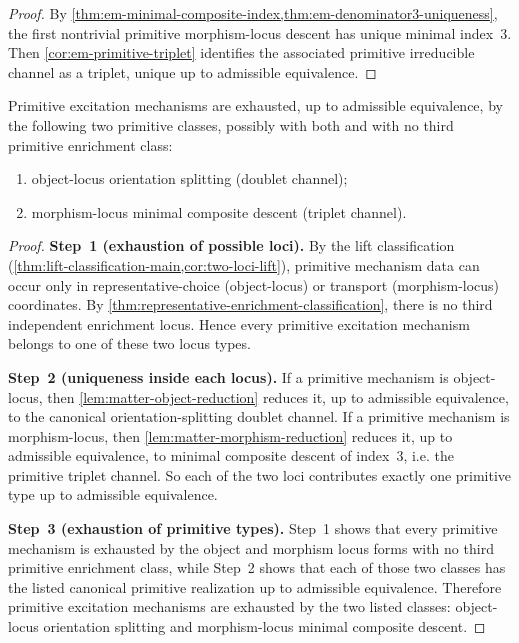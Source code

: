 \begin{proof}
By
\cref{thm:em-minimal-composite-index,thm:em-denominator3-uniqueness},
the first nontrivial primitive morphism-locus descent has unique minimal
index~$3$.
Then \cref{cor:em-primitive-triplet} identifies the associated primitive
irreducible channel as a triplet, unique up to admissible equivalence.
\end{proof}

\begin{theorem}
\label{thm:matter-primitive-uniqueness}
Primitive excitation mechanisms are exhausted, up to admissible
equivalence, by the following two primitive classes, possibly with
both and with no third primitive enrichment class:
\begin{enumerate}[label=\textup{(\roman*)}]
\item object-locus orientation splitting (doublet channel);
\item morphism-locus minimal composite descent (triplet channel).
\end{enumerate}
\end{theorem}

\begin{proof}
\textbf{Step~1 (exhaustion of possible loci).}
By the lift classification
(\cref{thm:lift-classification-main,cor:two-loci-lift}), primitive
mechanism data can occur only in representative-choice (object-locus)
or transport (morphism-locus) coordinates.
By
\cref{thm:representative-enrichment-classification}, there is no third
independent enrichment locus.
Hence every primitive excitation mechanism belongs to one of these two
locus types.

\textbf{Step~2 (uniqueness inside each locus).}
If a primitive mechanism is object-locus, then
\cref{lem:matter-object-reduction} reduces it, up to admissible
equivalence, to the canonical orientation-splitting doublet channel.
If a primitive mechanism is morphism-locus, then
\cref{lem:matter-morphism-reduction} reduces it, up to admissible
equivalence, to minimal composite descent of index~$3$, i.e. the
primitive triplet channel.
So each of the two loci contributes exactly one primitive type up to
admissible equivalence.

\textbf{Step~3 (exhaustion of primitive types).}
Step~1 shows that every primitive mechanism is exhausted by the object
and morphism locus forms with no third primitive enrichment class,
while Step~2 shows that each of those two classes has the listed
canonical primitive realization up to admissible equivalence.
Therefore primitive excitation mechanisms are exhausted by the two
listed classes: object-locus orientation splitting and morphism-locus
minimal composite descent.
\end{proof}

